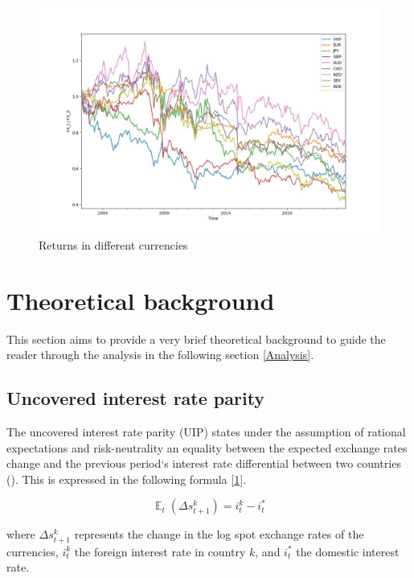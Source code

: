 \documentclass[a4paper,11pt,oneside]{article}
\DeclareMathOperator{\EX}{\mathbb{E}}%
\begin{document}
\begin{figure}[h]
    \centering
    \includegraphics[width=\textwidth]{figures/ccy_perfs.jpg}
    \caption{Returns in different currencies}
    \label{fig:1}
\end{figure}


\newpage  
\section{Theoretical background}\label{Theoretical background}
This section aims to provide a very brief theoretical background to guide the reader through the analysis in the following section \ref{Analysis}.\par   

\subsection{Uncovered interest rate parity}\label{Uncovered interest rate parity}
The uncovered interest rate parity (UIP) states under the assumption of rational expectations and risk-neutrality an equality between the expected exchange rates change and the previous period`s interest rate differential between two countries (\cite{Grisse and Nitschka 2015}). This is expressed in the following formula \ref{1}.\par  

\begin{equation}\label{1}
\EX_{t}(\Delta s_{t+1}^k)= i_{t}^k-i_{t}^*
\end{equation}

where $\Delta s_{t+1}^k$ represents the change in the log spot exchange rates of the currencies, $i_{t}^k$ the foreign interest rate in country $k$, and $i_{t}^*$ the domestic interest rate.\par
\end{document}
